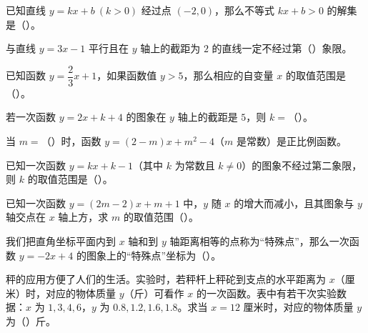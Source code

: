 \documentclass{exam-zh}
\begin{document}
\begin{question}[points=4]
  已知直线 $y=kx+b\ (k>0)$ 经过点 $(-2,0)$，那么不等式 $kx+b>0$ 的解集是（\qquad）。
\end{question}



\begin{question}[points=4]
  与直线 $y=3x-1$ 平行且在 $y$ 轴上的截距为 $2$ 的直线一定不经过第（\qquad）象限。
\end{question}



\begin{question}[points=4]
  已知函数 $y=\dfrac23x+1$，如果函数值 $y>5$，那么相应的自变量 $x$ 的取值范围是（\qquad）。
\end{question}



\begin{question}[points=4]
  若一次函数 $y=2x+k+4$ 的图象在 $y$ 轴上的截距是 $5$，则 $k=$（\qquad）。
\end{question}



\begin{question}[points=4]
  当 $m=$（\qquad）时，函数 $y=(2-m)x+m^2-4$（$m$ 是常数）是正比例函数。
\end{question}



\begin{question}[points=4]
  已知一次函数 $y=kx+k-1$（其中 $k$ 为常数且 $k\ne0$）的图象不经过第二象限，则 $k$ 的取值范围是（\qquad）。
\end{question}



\begin{question}[points=4]
  已知一次函数 $y=(2m-2)x+m+1$ 中，$y$ 随 $x$ 的增大而减小，且其图象与 $y$ 轴交点在 $x$ 轴上方，求 $m$ 的取值范围（\qquad）。
\end{question}



\begin{question}[points=4]
  我们把直角坐标平面内到 $x$ 轴和到 $y$ 轴距离相等的点称为“特殊点”，那么一次函数 $y=-2x+4$ 的图象上的“特殊点”坐标为（\qquad）。
\end{question}



\begin{question}[points=4]
  秤的应用方便了人们的生活。实验时，若秤杆上秤砣到支点的水平距离为 $x$（厘米）时，对应的物体质量 $y$（斤）可看作 $x$ 的一次函数。表中有若干次实验数据：$x$ 为 $1,3,4,6$，$y$ 为 $0.8,1.2,1.6,1.8$。求当 $x=12$ 厘米时，对应的物体质量 $y$ 为（\qquad）斤。
\end{question}
\end{document}
